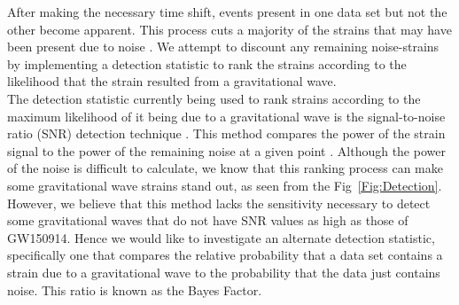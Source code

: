 \documentclass{article}
\begin{document}
  
    After making the necessary time shift, events present in one data set but not the other become apparent. This process cuts a majority of the strains that may have been present due to noise \cite{DetectionPaper}. We attempt to discount any remaining noise-strains by implementing a detection statistic to rank the strains according to the likelihood that the strain resulted from a gravitational wave.\\
  
  
  \indent The detection statistic currently being used to rank strains according to the maximum likelihood of it being due to a gravitational wave is the signal-to-noise ratio (SNR) detection technique \cite{Enia}. This method compares the power of the strain signal to the power of the remaining noise at a given point \cite{RSmith}. Although the power of the noise is difficult to calculate, we know that this ranking process can make some gravitational wave strains stand out, as seen from the Fig~\ref{Fig:Detection}.  However, we believe that this method lacks the sensitivity necessary to detect some gravitational waves that do not have SNR values as high as those of GW150914. Hence we would like to investigate an alternate detection statistic, specifically one that compares the relative probability that a data set contains a strain due to a gravitational wave to the probability that the data just contains noise. This ratio is known as the Bayes Factor.\\
  
\end{document}
